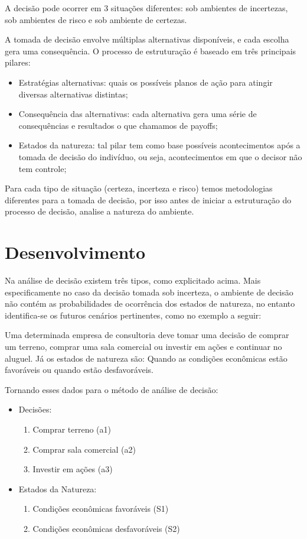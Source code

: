 \documentclass[
	12pt,				%
	openright,			%
	oneside,			%
	a4paper,			%
	english,			%
	french,				%
	spanish,			%
	brazil				%
	]{abntex2}
\begin{document}
A decisão pode ocorrer em 3 situações diferentes: sob ambientes de incertezas, sob ambientes de risco e sob ambiente de certezas.
	
A tomada de decisão envolve múltiplas alternativas disponíveis, e cada escolha gera uma consequência. O processo de estruturação é baseado em três principais pilares:

\begin{itemize}
\item Estratégias alternativas: quais os possíveis planos de ação para atingir diversas alternativas distintas;
\item Consequência das alternativas: cada alternativa gera uma série de consequências e resultados o que chamamos de payoffs;
\item Estados da natureza: tal pilar tem como base possíveis acontecimentos após a tomada de decisão do indivíduo, ou seja, acontecimentos em que o decisor não tem controle;
\end{itemize}

Para cada tipo de situação (certeza, incerteza e risco) temos metodologias diferentes para a tomada de decisão, por isso antes de iniciar a estruturação do processo de decisão, analise a natureza do ambiente. \cite{introduction}

\chapter{Desenvolvimento}

Na análise de decisão existem três tipos, como explicitado acima. Mais especificamente no caso da decisão tomada sob incerteza, o ambiente de decisão não contém as probabilidades de ocorrência dos estados de natureza, no entanto identifica-se os futuros cenários pertinentes, como no exemplo a seguir:
	
Uma determinada empresa de consultoria deve tomar uma decisão de comprar um terreno, comprar uma sala comercial ou investir em ações e continuar no aluguel. Já os estados de natureza são: Quando as condições econômicas estão favoráveis ou quando estão desfavoráveis. \cite{introduction}

Tornando esses dados para o método de análise de decisão:

\begin{itemize}
\item Decisões:
\begin{enumerate}
\item Comprar terreno (a1)
\item Comprar sala comercial (a2)
\item Investir em ações (a3)
\end{enumerate}
\item Estados da Natureza:
\begin{enumerate}
\item Condições econômicas favoráveis (S1)
\item Condições econômicas desfavoráveis (S2)
\end{enumerate}
\end{itemize}
\end{document}
